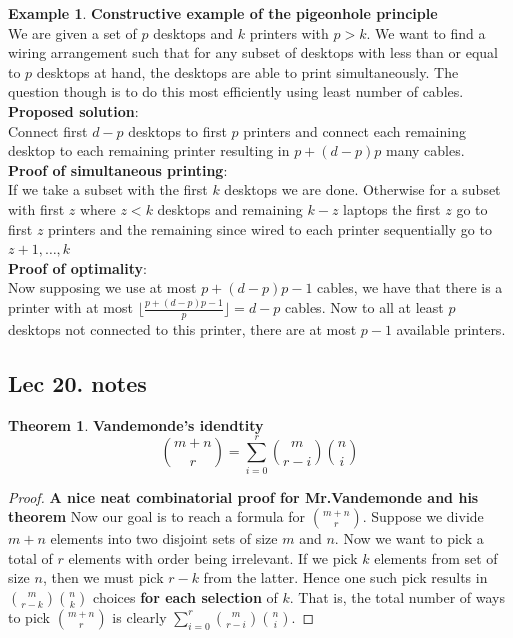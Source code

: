 \documentclass[titlepage]{article}
\theoremstyle{definition}
\newcommand{\floor}[1]{\lfloor #1 \rfloor}
\newtheorem{theorem}{Theorem}[section]
\newtheorem{example}{Example}
\numberwithin{equation}{subsection}
\numberwithin{remark}{subsection}
\begin{document}
\begin{example}\textbf{Constructive example of the pigeonhole principle}
\\

We are given a set of $p$ desktops and $k$ printers with $p>k$. We want to find a wiring arrangement such that for any subset of desktops with less than or equal to $p$ desktops at hand, the desktops are able to print simultaneously. The question though is to do this most efficiently using least number of cables. 
\\

\textbf{Proposed solution}:
\\
Connect first $d-p$ desktops to first $p$ printers and connect each remaining desktop to each remaining printer resulting in $p + (d-p)p$ many cables. 
\\

\textbf{Proof of simultaneous printing}:
\\
If we take a subset with the first $k$ desktops we are done. Otherwise for a subset with first $z$ where $z<k$ desktops and remaining $k-z$ laptops the first $z$ go to first $z$ printers and the remaining since wired to each printer sequentially go to $z+1, \ldots, k$
\\

\textbf{Proof of optimality}:
\\
Now supposing we use at most $p + (d-p)p - 1$ cables, we have that there is a printer with at most $\floor{\frac{p + (d-p)p - 1}{p}} = d - p$ cables. Now to all at least $p$ desktops not connected to this printer, there are at most $p-1$ available printers. 
\end{example}

\subsection{Lec 20. notes}
\begin{theorem}\textbf{Vandemonde's idendtity}
\\

$$\binom{m+n}{r} = \sum_{i=0}^{r}\binom{m}{r-i}\binom{n}{i}$$
\end{theorem}

\begin{proof}\textbf{A nice neat combinatorial proof for Mr.Vandemonde and his theorem}
Now our goal is to reach a formula for $\binom{m+n}{r}$. Suppose we divide $m+n$ elements into two disjoint sets of size $m$ and $n$. Now we want to pick a total of $r$ elements with order being irrelevant. If we pick $k$ elements from set of size $n$, then we must pick $r-k$ from the latter. Hence one such pick results in $\binom{m}{r-k}\binom{n}{k}$ choices \textbf{for each selection} of $k$. That is, the total number of ways to pick $\binom{m+n}{r}$ is clearly $\sum_{i=0}^{r}\binom{m}{r-i}\binom{n}{i}$. 
\end{proof}
\end{document}
